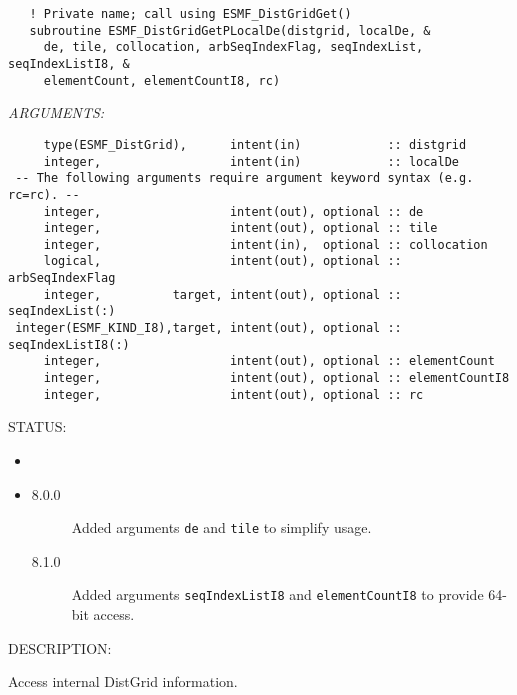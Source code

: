  
\begin{verbatim}   ! Private name; call using ESMF_DistGridGet()
   subroutine ESMF_DistGridGetPLocalDe(distgrid, localDe, &
     de, tile, collocation, arbSeqIndexFlag, seqIndexList, seqIndexListI8, &
     elementCount, elementCountI8, rc)\end{verbatim}{\em ARGUMENTS:}
\begin{verbatim}     type(ESMF_DistGrid),      intent(in)            :: distgrid
     integer,                  intent(in)            :: localDe
 -- The following arguments require argument keyword syntax (e.g. rc=rc). --
     integer,                  intent(out), optional :: de
     integer,                  intent(out), optional :: tile
     integer,                  intent(in),  optional :: collocation
     logical,                  intent(out), optional :: arbSeqIndexFlag
     integer,          target, intent(out), optional :: seqIndexList(:)
 integer(ESMF_KIND_I8),target, intent(out), optional :: seqIndexListI8(:)
     integer,                  intent(out), optional :: elementCount
     integer,                  intent(out), optional :: elementCountI8
     integer,                  intent(out), optional :: rc
           \end{verbatim}
{\sf STATUS:}
   \begin{itemize}
   \item{}
   \item{}
   \begin{description}
   \item[8.0.0] Added arguments {\tt de} and {\tt tile} to simplify usage.
   \item[8.1.0] Added arguments {\tt seqIndexListI8} and {\tt elementCountI8}
                to provide 64-bit access.
   \end{description}
   \end{itemize}
  
{\sf DESCRIPTION:\\ }


     Access internal DistGrid information.
  
